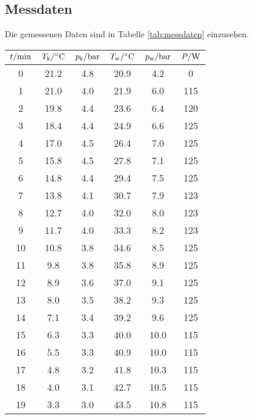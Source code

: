 \subsection{Messdaten}
Die gemessenen Daten sind in Tabelle \ref{tab:messdaten} einzusehen. 

\begin{table}[H]
    \centering
    \begin{tabular}[]{S[table-format=2.0] S S[table-format=1.1] S S S[table-format=3.0]}
        \toprule
        {$t / \unit[]{\minute}$} & {$T_\text{k} / \unit[]{\degreeCelsius}$} & {$p_\text{k} / \unit[]{\bar}$} & {$T_\text{w} / \unit[]{\degreeCelsius}$} & {$p_\text{w} / \unit[]{\bar}$} & {$P / \unit[]{\watt}$} \\
         & 21.2  &  4.8 & 20.9  &   4.2  &  0   \\  
        1 & 21.0  &  4.0 & 21.9  &   6.0  &  115 \\
        2 & 19.8  &  4.4 & 23.6  &   6.4  &  120 \\
        3 & 18.4  &  4.4 & 24.9  &   6.6  &  125 \\
        4 & 17.0  &  4.5 & 26.4  &   7.0  &  125 \\
        5 & 15.8  &  4.5 & 27.8  &   7.1  &  125 \\
        6 & 14.8  &  4.4 & 29.4  &   7.5  &  125 \\
        7 & 13.8  &  4.1 & 30.7  &   7.9  &  123 \\
        8 & 12.7  &  4.0 & 32.0  &   8.0  &  123 \\
        9 & 11.7  &  4.0 & 33.3  &   8.2  &  123 \\
       10 & 10.8  &  3.8 & 34.6  &   8.5  &  125 \\
       11 &  9.8  &  3.8 & 35.8  &   8.9  &  125 \\
       12 &  8.9  &  3.6 & 37.0  &   9.1  &  125 \\
       13 &  8.0  &  3.5 & 38.2  &   9.3  &  125 \\
       14 &  7.1  &  3.4 & 39.2  &   9.6  &  125 \\
       15 &  6.3  &  3.3 & 40.0  &  10.0  &  115 \\
       16 &  5.5  &  3.3 & 40.9  &  10.0  &  115 \\
       17 &  4.8  &  3.2 & 41.8  &  10.3  &  115 \\
       18 &  4.0  &  3.1 & 42.7  &  10.5  &  115 \\
       19 &  3.3  &  3.0 & 43.5  &  10.8  &  115 \\

\end{tabular}
\end{table}

